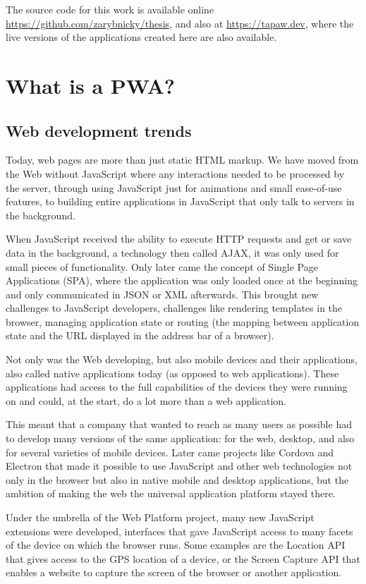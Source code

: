 \documentclass[english,zadani,odsaz]{fitthesis}
\begin{document}
The source code for this work is available online
\url{https://github.com/zarybnicky/thesis}, and also at \url{https://tapaw.dev}, where the
live versions of the applications created here are also available.

\chapter{What is a PWA?}
\label{sec:orgc9d286d}
\section{Web development trends}
\label{sec:orgcb43bb9}
Today, web pages are more than just static HTML markup. We have moved from the
Web without JavaScript where any interactions needed to be processed by the
server, through using JavaScript just for animations and small ease-of-use
features, to building entire applications in JavaScript that only talk to
servers in the background.

When JavaScript received the ability to execute HTTP requests and get or save
data in the background, a technology then called AJAX, it was only used for
small pieces of functionality. Only later came the concept of Single Page
Applications (SPA), where the application was only loaded once at the beginning
and only communicated in JSON or XML afterwards. This brought new challenges to
JavaScript developers, challenges like rendering templates in the browser,
managing application state or routing (the mapping between application state and
the URL displayed in the address bar of a browser).

Not only was the Web developing, but also mobile devices and their applications,
also called native applications today (as opposed to web applications). These
applications had access to the full capabilities of the devices they were
running on and could, at the start, do a lot more than a web application.

This meant that a company that wanted to reach as many users as possible had to
develop many versions of the same application: for the web, desktop, and also
for several varieties of mobile devices. Later came projects like Cordova
and Electron that made it possible to use JavaScript and other web technologies
not only in the browser but also in native mobile and desktop applications, but
the ambition of making the web the universal application platform stayed there.

Under the umbrella of the Web Platform project, many new JavaScript extensions
were developed, interfaces that gave JavaScript access to many facets of the
device on which the browser runs. Some examples are the Location API that gives
access to the GPS location of a device, or the Screen Capture API that enables a
website to capture the screen of the browser or another application.
\end{document}
